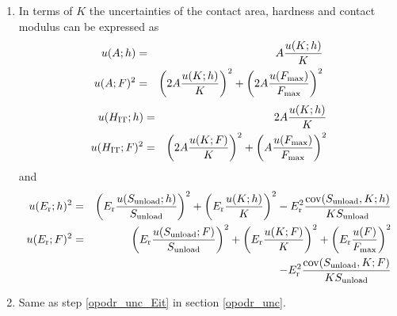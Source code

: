 \begin{enumerate}
\item \label{slopes_unc_A_H_E}
In terms of $K$ the uncertainties of the contact area, hardness and contact modulus can be expressed as
\begin{eqnarray}
 u(A;h) &=& A \frac{u(K;h)}{K} \nonumber \\
 u(A;F)^2 &=&  \left(2 A \frac{u(K;h)}{K} \right)^2 + \left(2 A \frac{u(F_\mathrm{max})}{F_\mathrm{max}} \right)^2 \nonumber \\
 \end{eqnarray}
\begin{eqnarray}
 u(H_\mathrm{IT};h) &=& 2 A \frac{u(K;h)}{K} \nonumber \\
 u(H_\mathrm{IT};F)^2 &=& \left( 2 A \frac{u(K;F)}{K} \right)^2 + \left( A\frac{u(F_\mathrm{max})}{F_\mathrm{max}} \right)^2 \nonumber \\
\end{eqnarray}
and 
\begin{eqnarray}
 u(E_\mathrm{r};h)^2  &=& \left( E_\mathrm{r} \frac{u(S_{\mathrm{unload}};h)}{S_{\mathrm{unload}}}  \right)^2  +  \left( E_\mathrm{r} \frac{u(K;h)}{K}  \right)^2 -E_\mathrm{r}^2 \frac{\mathrm{cov}(S_{\mathrm{unload}},K;h)}{KS_{\mathrm{unload}}}  \nonumber \\ 
 u(E_\mathrm{r};F)^2  &=& \left( E_\mathrm{r} \frac{u(S_{\mathrm{unload}};F)}{S_{\mathrm{unload}}}  \right)^2  +  \left( E_\mathrm{r} \frac{u(K;F)}{K}  \right)^2 + \left( E_\mathrm{r} \frac{u(F)}{F_\mathrm{max}} \right)^2  \nonumber\\
&& - E_\mathrm{r}^2 \frac{\mathrm{cov}(S_{\mathrm{unload}},K;F)}{KS_{\mathrm{unload}}}
\end{eqnarray}




\item \label{slopes_unc_Eit}
  Same as step \ref{opodr_unc_Eit} in section \ref{opodr_unc}.


\end{enumerate}
